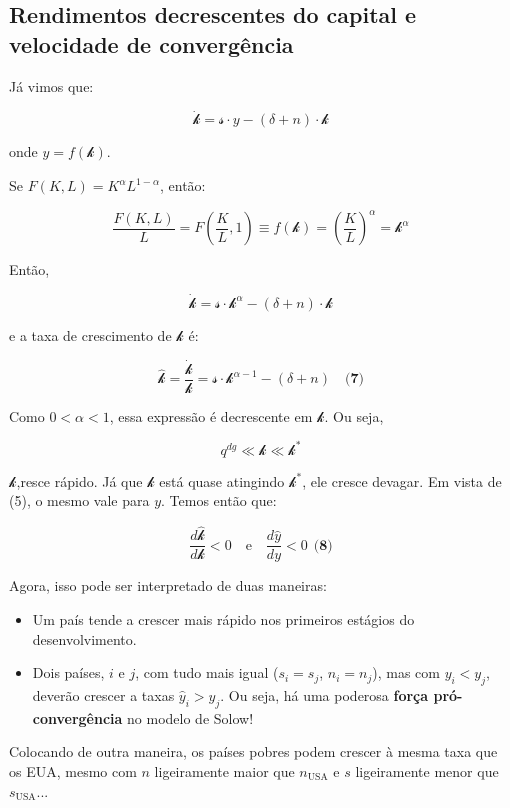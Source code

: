 \documentclass[a4paper,12pt]{article}[abntex2]
\begin{document}
\subsection{\textbf{Rendimentos decrescentes do capital e velocidade de convergência}}

Já vimos que:

\[
\dot{\mathcal{k}} = \mathcal{s} \cdot y - (\delta + n) \cdot \mathcal{k}
\]

onde \( y = f(\mathcal{k}) \).

Se \( F(K, L) = K^{\alpha} L^{1-\alpha} \), então:

\[
\frac{F(K, L)}{L} = F\left(\frac{K}{L}, 1\right) \equiv f(\mathcal{k}) = \left(\frac{K}{L}\right)^\alpha = \mathcal{k}^{\alpha}
\]

Então,

\[
\dot{\mathcal{k}} = \mathcal{s} \cdot \mathcal{k}^{\alpha} - (\delta + n) \cdot \mathcal{k}
\]

e a taxa de crescimento de \( \mathcal{k} \) é:

\[
\hat{\mathcal{k}} = \frac{\dot{\mathcal{k}}}{\mathcal{k}} = \mathcal{s} \cdot \mathcal{k}^{\alpha - 1} - (\delta + n) \quad \textbf{(7)}
\]

Como \( 0 < \alpha < 1 \), essa expressão é decrescente em \( \mathcal{k} \). Ou seja,

\[
q^{dg} \ll \mathcal{k} \ll \mathcal{k}^*
\]

\(\mathcal{k}\),resce rápido. Já que \( \mathcal{k} \) está quase atingindo \( \mathcal{k}^* \), ele cresce devagar. Em vista de (5), o mesmo vale para \( y \). Temos então que:

\[
\frac{d\hat{\mathcal{k}}}{d\mathcal{k}} < 0 \quad \text{e} \quad \frac{d\hat{y}}{dy} < 0 \ \ \textbf{(8)}
\]

Agora, isso pode ser interpretado de duas maneiras:

\begin{itemize}
    \item Um país tende a crescer mais rápido nos primeiros estágios do desenvolvimento.

    \item Dois países, \( i \) e \( j \), com tudo mais igual (\( s_i = s_j \), \( n_i = n_j \)), mas com \( y_i < y_j \), deverão crescer a taxas \( \hat{y}_i > \hat{y}_j \). Ou seja, há uma poderosa \textbf{força pró-convergência} no modelo de Solow!

\end{itemize}

Colocando de outra maneira, os países pobres podem crescer à mesma taxa que os EUA, mesmo com \( n \) ligeiramente maior que \( n_{\text{USA}} \) e \( s \) ligeiramente menor que \( s_{\text{USA}} \)... 
\end{document}
